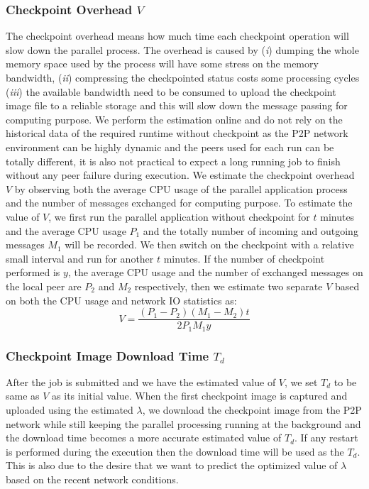 \documentclass[times, 12pt, onecolumn]{article}
\begin{document}
\subsubsection{Checkpoint Overhead $V$}

The checkpoint overhead means how much time each checkpoint operation
will slow down the parallel process. The overhead is caused by (\emph{i}) dumping
the whole memory space used by the process will have some stress on the memory bandwidth, (\emph{ii}) 
compressing the checkpointed status costs some processing cycles (\emph{iii}) the available bandwidth 
need to be consumed to upload the checkpoint image file to a reliable storage and this will slow down 
the message passing for computing purpose. We perform the estimation online and do not rely on the historical 
data of the required runtime without checkpoint as the P2P network environment can be highly dynamic and 
the peers used for each run can be totally different, it is also not practical to expect a long running job 
to finish without any peer failure during execution. We estimate 
the checkpoint overhead $V$ by observing both the average CPU usage of the parallel application process and 
the number of messages exchanged for computing purpose. To estimate the value of $V$, we first run the 
parallel application without checkpoint for $t$ minutes and the average CPU usage $P_1$ and the totally
number of incoming and outgoing messages $M_1$ will be recorded. We then switch on the checkpoint with a 
relative small interval and run for another $t$ minutes. If the number of checkpoint performed is $y$, 
the average CPU usage and the number of exchanged messages on the local peer are $P_2$ and $M_2$ respectively,
then we estimate two separate $V$ based on both the CPU usage and network IO statistics as:
\begin{equation} 
V={\frac{\left(P_1-P_2\right)\left(M_1-M_2\right) t}{2 P_1 M_1 y}}
\end{equation}

\subsubsection{Checkpoint Image Download Time $T_d$}

After the job is submitted and we have the estimated value
of $V$, we set $T_d$ to be same as $V$ as its initial value. When the first checkpoint image is captured
and uploaded using the estimated $\lambda$, we download the checkpoint image from the P2P network while
still keeping the parallel processing running at the background and the download time becomes a more 
accurate estimated value of $T_d$. If any restart is performed during the execution then the download
time will be used as the $T_d$. This is also due to the desire that we want to predict the optimized value
of $\lambda$ based on the recent network conditions. 
\end{document}
